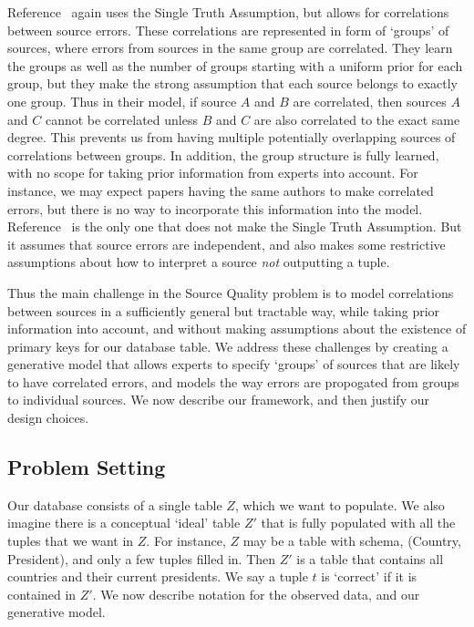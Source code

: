 \documentclass{sig-alternate}
\newcounter{prob}
\begin{document}
Reference~\cite{Qi:2013:MCI:2488388.2488479} again uses the Single Truth Assumption, but allows for correlations between source errors. These correlations are represented in form of `groups' of sources, where errors from sources in the same group are correlated. They learn the groups as well as the number of groups starting with a uniform prior for each group, but they make the strong assumption that each source belongs to exactly one group. Thus in their model, if source $A$ and $B$ are correlated, then sources $A$ and $C$ cannot be correlated unless $B$ and $C$ are also correlated to the exact same degree. This prevents us from having multiple potentially overlapping sources of correlations between groups. In addition, the group structure is fully learned, with no scope for taking prior information from experts into account. For instance, we may expect papers having the same authors to make correlated errors, but there is no way to incorporate this information into the model. Reference~\cite{Zhao:2012:BAD:2168651.2168656} is the only one that does not make the Single Truth Assumption. But it assumes that source errors are independent, and also makes some restrictive assumptions about how to interpret a source {\em not} outputting a tuple.

Thus the main challenge in the Source Quality problem is to model correlations between sources in a sufficiently general but tractable way, while taking prior information into account, and without making assumptions about the existence of primary keys for our database table. We address these challenges by creating a generative model that allows experts to specify `groups' of sources that are likely to have correlated errors, and models the way errors are propogated from groups to individual sources. We now describe our framework, and then justify our design choices. 

\subsection{Problem Setting}\label{sec:formal}
Our database consists of a single table $Z$, which we want to populate. We also imagine there is a conceptual `ideal' table $Z'$ that is fully populated with all the tuples that we want in $Z$. For instance, $Z$ may be a table with schema, (Country, President), and only a few tuples filled in. Then $Z'$ is a table that contains all countries and their current presidents. We say a tuple $t$ is `correct' if it is contained in $Z'$. We now describe notation for the observed data, and our generative model.
\end{document}
